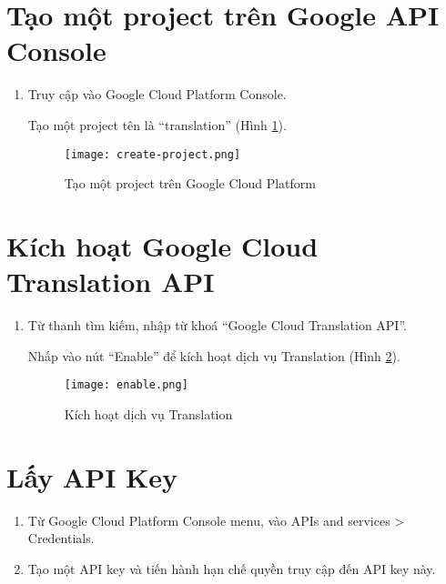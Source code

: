 \documentclass[../thesis.tex]{subfiles}
\begin{document}
\section{Tạo một project trên Google API Console}

\begin{enumerate}
	\item Truy cập vào Google Cloud Platform Console.
	\begin{item}
	Tạo một project tên là ``translation'' (Hình \ref{Tao mot project tren Google Cloud Platform}).
	\begin{figure}
		\texttt{[image: create-project.png]}
		\caption{Tạo một project trên Google Cloud Platform}
		\label{Tao mot project tren Google Cloud Platform}
	\end{figure}
	\end{item}
\end{enumerate}

\section{Kích hoạt Google Cloud Translation API}
\begin{enumerate}
	\item Từ thanh tìm kiếm, nhập từ khoá ``Google Cloud Translation API''.
	\begin{item}
	Nhấp vào nút ``Enable'' để kích hoạt dịch vụ Translation (Hình \ref{Kich hoat dich vu Translation}).
	\begin{figure}
		\texttt{[image: enable.png]}
		\caption{Kích hoạt dịch vụ Translation}
		\label{Kich hoat dich vu Translation}
	\end{figure}
	\end{item}
\end{enumerate}


\section{Lấy API Key}
\begin{enumerate}
	\item Từ Google Cloud Platform Console menu, vào APIs and services > Credentials.
	\item Tạo một API key và tiến hành hạn chế quyền truy cập đến API key này.
\end{enumerate}
\end{document}
